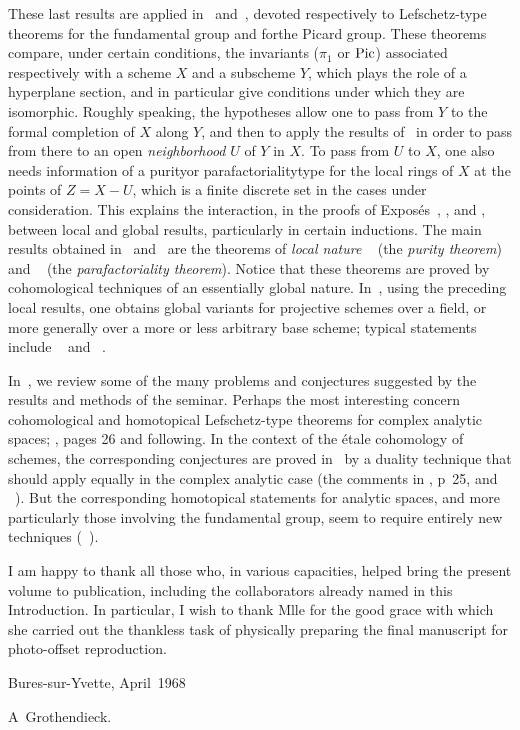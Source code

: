 These last results are applied in~ and~, devoted
respectively to Lefschetz-type theorems for the fundamental group and
for\pageoriginale the Picard group. These theorems compare, under certain
conditions, the invariants ($\pi_1$ or $\operatorname{Pic}$) associated respectively
with a scheme $X$ and a subscheme $Y$, which plays the role of a
hyperplane section, and in particular give conditions under which they
are isomorphic. Roughly speaking, the hypotheses allow one to pass from
$Y$ to the formal completion of $X$ along $Y$, and then to apply the
results of~ in order to pass from there to an open
\emph{neighborhood} $U$ of $Y$ in $X$. To pass from $U$ to $X$, one also
needs information of a \og purity\fg or \og parafactoriality\fg type for
the local rings of $X$ at the points of $Z=X-U$, which is a finite
discrete set in the cases under consideration. This explains the
interaction, in the proofs of Expos\'es~, , and ,
between local and global results, particularly in certain inductions. The
main results obtained in~ and~ are the theorems of
\emph{local nature} ~ (the \emph{purity theorem}) and
~ (the \emph{parafactoriality theorem}). Notice that
these theorems are proved by cohomological techniques of an essentially
global nature. In~, using the preceding local results, one
obtains global variants for projective schemes over a field, or more
generally over a more or less arbitrary base scheme; typical statements
include ~ and ~.

In~, we review some of the many problems and conjectures
suggested by the results and methods of the seminar. Perhaps the most
interesting concern cohomological and homotopical Lefschetz-type theorems
for complex analytic spaces; \cf {}, pages 26 and following. In the context of the \'etale cohomology of
schemes\pageoriginale, the corresponding conjectures are proved
in~ by a duality technique that should apply equally in the
complex analytic case (\cf the comments in , p\ptbl~25, and
~). But the corresponding homotopical statements
for analytic spaces, and more particularly those involving the
fundamental group, seem to require entirely new techniques
(\cf {}~).

I am happy to thank all those who, in various capacities, helped bring the
present volume to publication, including the collaborators already named
in this Introduction. In particular, I wish to thank Mlle
 for the good grace with which she carried out the
thankless task of physically preparing the final manuscript for
photo-offset reproduction.

\bigskip\hfill Bures-sur-Yvette, April~1968
\par\smallskip \hfill A\ptbl~Grothendieck.
